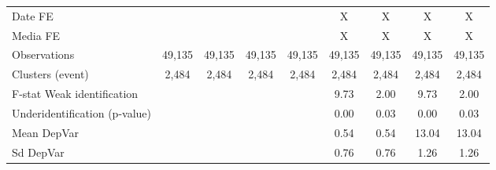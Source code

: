 {\begin{tabular}{l*{8}{c}}
\hline
Date FE             &                     &                     &                     &                     &           X         &           X         &           X         &           X         \\
Media FE            &                     &                     &                     &                     &           X         &           X         &           X         &           X         \\
Observations        &      49,135         &      49,135         &      49,135         &      49,135         &      49,135         &      49,135         &      49,135         &      49,135         \\
Clusters (event)    &       2,484         &       2,484         &       2,484         &       2,484         &       2,484         &       2,484         &       2,484         &       2,484         \\
F-stat Weak identification&                     &                     &                     &                     &        9.73         &        2.00         &        9.73         &        2.00         \\
Underidentification (p-value)&                     &                     &                     &                     &        0.00         &        0.03         &        0.00         &        0.03         \\
Mean DepVar         &                     &                     &                     &                     &        0.54         &        0.54         &       13.04         &       13.04         \\
Sd DepVar           &                     &                     &                     &                     &        0.76         &        0.76         &        1.26         &        1.26         \\
\hline\hline
\end{tabular}
}
